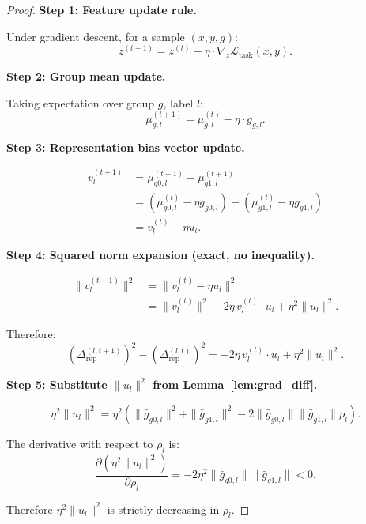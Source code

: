 \documentclass[11pt]{article}
\begin{document}
\begin{proof}
    \textbf{Step 1: Feature update rule.}

    Under gradient descent, for a sample $(x, y, g)$:
    \begin{equation}
        z^{(t+1)} = z^{(t)} - \eta \cdot \nabla_z \mathcal{L}_{\text{task}}(x, y).
    \end{equation}

    \textbf{Step 2: Group mean update.}

    Taking expectation over group $g$, label $l$:
    \begin{equation}
        \mu_{g,l}^{(t+1)} = \mu_{g,l}^{(t)} - \eta \cdot \bar{g}_{g,l}.
    \end{equation}

    \textbf{Step 3: Representation bias vector update.}

    \begin{align}
        v_l^{(t+1)} &= \mu_{g0,l}^{(t+1)} - \mu_{g1,l}^{(t+1)} \\
        &= (\mu_{g0,l}^{(t)} - \eta \bar{g}_{g0,l}) - (\mu_{g1,l}^{(t)} - \eta \bar{g}_{g1,l}) \\
        &= v_l^{(t)} - \eta u_l.
    \end{align}

    \textbf{Step 4: Squared norm expansion (exact, no inequality).}

    \begin{align}
        \|v_l^{(t+1)}\|^2 &= \|v_l^{(t)} - \eta u_l\|^2 \\
        &= \|v_l^{(t)}\|^2 - 2\eta\, v_l^{(t)} \cdot u_l + \eta^2 \|u_l\|^2.
    \end{align}

    Therefore:
    \begin{equation}
        \left(\Delta_{\mathrm{rep}}^{(l,t+1)}\right)^2 - \left(\Delta_{\mathrm{rep}}^{(l,t)}\right)^2 = -2\eta\, v_l^{(t)} \cdot u_l + \eta^2 \|u_l\|^2.
    \end{equation}

    \textbf{Step 5: Substitute $\|u_l\|^2$ from Lemma~\ref{lem:grad_diff}.}

    \begin{equation}
        \eta^2 \|u_l\|^2 = \eta^2\!\left(\|\bar{g}_{g0,l}\|^2 + \|\bar{g}_{g1,l}\|^2 - 2\|\bar{g}_{g0,l}\|\|\bar{g}_{g1,l}\|\rho_l\right).
    \end{equation}

    The derivative with respect to $\rho_l$ is:
    \begin{equation}
        \frac{\partial (\eta^2 \|u_l\|^2)}{\partial \rho_l} = -2\eta^2 \|\bar{g}_{g0,l}\|\|\bar{g}_{g1,l}\| < 0.
    \end{equation}

    Therefore $\eta^2\|u_l\|^2$ is strictly decreasing in $\rho_l$.
\end{proof}
\end{document}
